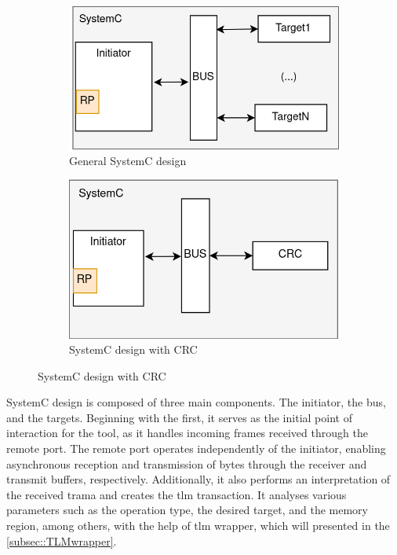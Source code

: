 \begin{figure}[H]
	\centering
	\begin{subfigure}{0.45\textwidth}
		\includegraphics[width=\textwidth]{Images/SystemCdesign.png}
 		\caption{General SystemC design}
	 	\label{fig_SystemCdesign_geral}
	\end{subfigure}
	\hfill
	\begin{subfigure}{0.45\textwidth}
		\centering
		\includegraphics[width=\textwidth]{Images/SystemCdesign_CRC.png}
		\caption{SystemC design with CRC}
		\label{fig_SystemCdesign_CRC}
	\end{subfigure}
		
	\label{fig:SystemCsdesign}
\end{figure}


SystemC design is composed of three main components. The initiator, the bus, and the targets. Beginning with the first, it serves as the initial 
point of interaction for the tool, as it handles incoming frames received through the remote port. The remote port operates independently 
of the initiator, enabling asynchronous reception and transmission of bytes through the receiver and transmit buffers, respectively.
Additionally, it also performs an interpretation of the received trama and creates the \gls{tlm} transaction. It analyses various 
parameters such as the operation type, the desired target, and the memory region, among others, with the help of \gls{tlm} wrapper, 
which will presented in the \autoref{subsec::TLMwrapper}.

